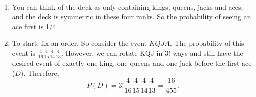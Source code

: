 
\setcounter{theorem}{36}
\begin{exercise}[BH.1.37]
\begin{solution}~
	\begin{enumerate}
		\item You can think of the deck as only containing kings, queens, jacks and aces, and the deck is symmetric in these four ranks. So the probability of seeing an ace first is 1/4.
		\item To start, fix an order. So consider the event $KQJA$.  The probability of this event is $\frac{4}{16}\frac{4}{15}\frac{4}{14}\frac{4}{13}$. However, we can rotate KQJ in $3!$ ways and still have the desired event of exactly one king, one queens and one jack before the first ace ($D$). Therefore,
			$$P(D) = 3!\frac{4}{16}\frac{4}{15}\frac{4}{14}\frac{4}{13}=\frac{16}{455}.$$
	\end{enumerate}
\end{solution}
\end{exercise}


